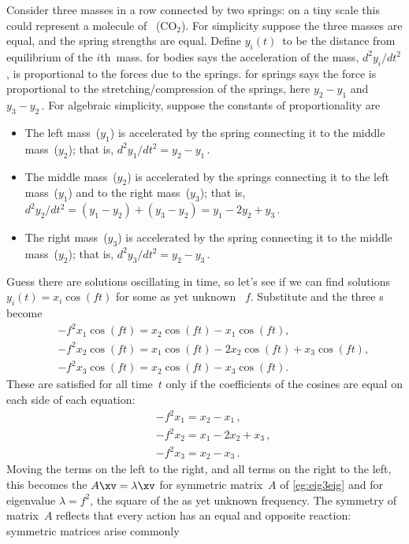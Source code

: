 \begin{reduce}
\begin{example} \label{eg:eig3vib}
Consider three masses in a row connected by two springs: on a tiny scale this could represent a molecule of ~(\(\text{CO}_2\)).
For simplicity suppose the three masses are equal, and the spring strengths are equal.
Define \(y_i(t)\)~to be the distance from equilibrium of the \(i\)th~mass.
 for bodies says the acceleration of the mass, \(d^2y_i/dt^2\), is proportional to the forces due to the springs.
 for springs says the force is proportional to the stretching\slash compression of the springs, here \(y_2-y_1\) and \(y_3-y_2\)\,.
For algebraic simplicity, suppose the constants of proportionality are 
\begin{itemize}
\item The left mass~(\(y_1\)) is accelerated by the spring connecting it to the middle mass~(\(y_2\)); that is, \(d^2y_1/dt^2=y_2-y_1\)\,.
\item The middle mass~(\(y_2\)) is accelerated by the springs connecting it to the left mass~(\(y_1\)) and to the right mass~(\(y_3\)); that is, \(d^2y_2/dt^2=(y_1-y_2)+(y_3-y_2)=y_1-2y_2+y_3\)\,.
\item The right mass~(\(y_3\)) is accelerated by the spring connecting it to the middle mass~(\(y_2\)); that is, \(d^2y_3/dt^2=y_2-y_3\)\,.
\end{itemize}
Guess there are solutions oscillating in time, so let's see if we can find solutions \(y_i(t)=x_i\cos(ft)\) for some as yet unknown ~\(f\).
Substitute and the three s become
\begin{eqnarray*}
&&-f^2x_1\cos(ft)=x_2\cos(ft)-x_1\cos(ft),
\\&&-f^2x_2\cos(ft)=x_1\cos(ft)-2x_2\cos(ft)+x_3\cos(ft),
\\&&-f^2x_3\cos(ft)=x_2\cos(ft)-x_3\cos(ft).
\end{eqnarray*}
These are satisfied for all time~\(t\) only if the coefficients of the cosines are equal on each side of each equation:
\begin{eqnarray*}
&&-f^2x_1=x_2-x_1\,,
\\&&-f^2x_2=x_1-2x_2+x_3\,,
\\&&-f^2x_3=x_2-x_3\,.
\end{eqnarray*}
Moving the terms on the left to the right, and all terms on the right to the left, this becomes the  \(A\xv=\lambda\xv\) for symmetric matrix~\(A\) of \cref{eg:eig3eig} and for eigenvalue \(\lambda=f^2\), the square of the as yet unknown frequency.
The symmetry of matrix~\(A\) reflects  that every action has an equal and opposite reaction: symmetric matrices arise commonly 


\end{example}
\end{reduce}
